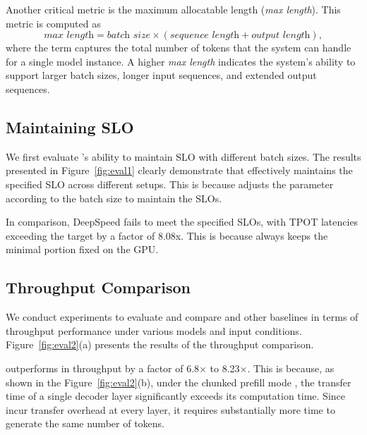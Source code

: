 Another critical metric is the maximum allocatable length (\textit{max length}). 
This metric is computed as 
\[
\textit{max length} = \textit{batch size} \times (\textit{sequence length} + \textit{output length}),
\]
where the term captures the total number of tokens that the system can handle for a single model instance. 
A higher \textit{max length} indicates the system's ability to support larger batch sizes, longer input sequences, and extended output sequences.

\begin{figure*}[t]
    \centering
    \resizebox{\textwidth}{!}{
 }
    \caption{Comparison of TPOT under different models and workloads. }
    \label{fig:eval1}
\end{figure*}

\subsection{Maintaining SLO}

We first evaluate \sys's ability to maintain SLO with different batch sizes. 
The results presented in Figure~\ref{fig:eval1} clearly demonstrate that \sys effectively maintains the specified SLO across different setups. 
This is because \sys adjusts the \interval parameter according to the batch size to maintain the SLOs. 
%

In comparison, DeepSpeed fails to meet the specified SLOs, 
with TPOT latencies exceeding the target by a factor of 8.08x. This is because \deepspeed always keeps the minimal portion fixed on the GPU.


\subsection{Throughput Comparison}
\label{sec:memsave}

We conduct experiments to evaluate and compare \sys and other baselines in terms of throughput performance under various models and input conditions. 
Figure~\ref{fig:eval2}(a) presents the results of the throughput comparison. 

\sys outperforms \deepspeed in throughput by a factor of 6.8× to 8.23×. 
This is because, as shown in the Figure~\ref{fig:eval2}(b), under the chunked prefill mode , 
the transfer time of a single decoder layer significantly exceeds its computation time. 
Since \deepspeed incur transfer overhead at every layer, it requires substantially more time to generate the same number of tokens.

